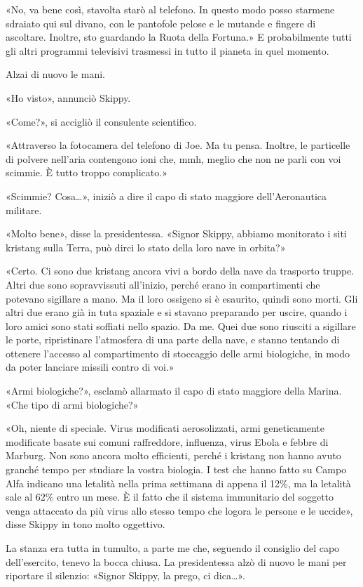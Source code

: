 «No, va bene così, stavolta starò al telefono. In questo modo posso
starmene sdraiato qui sul divano, con le pantofole pelose e le mutande e
fingere di ascoltare. Inoltre, sto guardando la Ruota della Fortuna.» E
probabilmente tutti gli altri programmi televisivi trasmessi in tutto il
pianeta in quel momento.

Alzai di nuovo le mani.

«Ho visto», annunciò Skippy.

«Come?», si accigliò il consulente scientifico.

«Attraverso la fotocamera del telefono di Joe. Ma tu pensa. Inoltre, le
particelle di polvere nell'aria contengono ioni che, mmh, meglio che non
ne parli con voi scimmie. È tutto troppo complicato.»

«Scimmie? Cosa\ldots», iniziò a dire il capo di stato maggiore
dell'Aeronautica militare.

«Molto bene», disse la presidentessa. «Signor Skippy, abbiamo monitorato
i siti kristang sulla Terra, può dirci lo stato della loro nave in
orbita?»

«Certo. Ci sono due kristang ancora vivi a bordo della nave da trasporto
truppe. Altri due sono sopravvissuti all'inizio, perché erano in
compartimenti che potevano sigillare a mano. Ma il loro ossigeno si è
esaurito, quindi sono morti. Gli altri due erano già in tuta spaziale e
si stavano preparando per uscire, quando i loro amici sono stati
soffiati nello spazio. Da me. Quei due sono riusciti a sigillare le
porte, ripristinare l'atmosfera di una parte della nave, e stanno
tentando di ottenere l'accesso al compartimento di stoccaggio delle armi
biologiche, in modo da poter lanciare missili contro di voi.»

«Armi biologiche?», esclamò allarmato il capo di stato maggiore della
Marina. «Che tipo di armi biologiche?»

«Oh, niente di speciale. Virus modificati aerosolizzati, armi
geneticamente modificate basate sui comuni raffreddore, influenza, virus
Ebola e febbre di Marburg. Non sono ancora molto efficienti, perché i
kristang non hanno avuto granché tempo per studiare la vostra biologia.
I test che hanno fatto su Campo Alfa indicano una letalità nella prima
settimana di appena il 12\%, ma la letalità sale al 62\% entro un mese.
È il fatto che il sistema immunitario del soggetto venga attaccato da
più virus allo stesso tempo che logora le persone e le uccide», disse
Skippy in tono molto oggettivo.

La stanza era tutta in tumulto, a parte me che, seguendo il consiglio
del capo dell'esercito, tenevo la bocca chiusa. La presidentessa alzò di
nuovo le mani per riportare il silenzio: «Signor Skippy, la prego, ci
dica\ldots».

